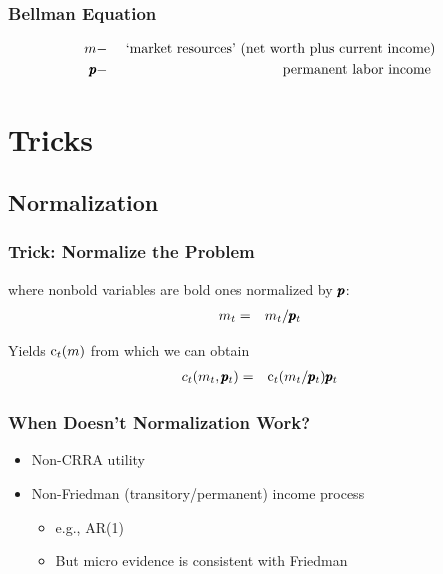 \documentclass{beamer}
\begin{document}
\begin{frame}[label=vrecurse]
\frametitle{\large\textbf{Bellman Equation}}



\begin{eqnarray*}
   m & - & \text{ `market resources' (net worth plus current income)}
\\ \pmb{p} & - & \text{ permanent labor income }
\end{eqnarray*}

\end{frame}

\section{Tricks}
\subsection{Normalization}
\begin{frame}[label=Normalize]
\frametitle{\large\textbf{Trick: Normalize the Problem}}



where nonbold variables are bold ones normalized by $\pmb{p}$:
\begin{eqnarray}
m_{t} & = & m_{t}/\pmb{p}_{t}
\end{eqnarray}

Yields $\mathrm{c}_{t}(m)$ from which we can obtain
\begin{eqnarray}
  c_{t}(m_{t},\pmb{p}_{t}) & = & \mathrm{c}_{t}(m_{t}/\pmb{p}_{t})\pmb{p}_{t}
\end{eqnarray}

\end{frame}

\begin{frame}[label=Normalize]
\frametitle{\large\textbf{When Doesn't Normalization Work?}}

\begin{itemize}
\item Non-CRRA utility
\item Non-Friedman (transitory/permanent) income process
\begin{itemize}
\item e.g., AR(1)
\item But micro evidence is consistent with Friedman
\end{itemize}
\end{itemize}

\end{frame}
\end{document}
